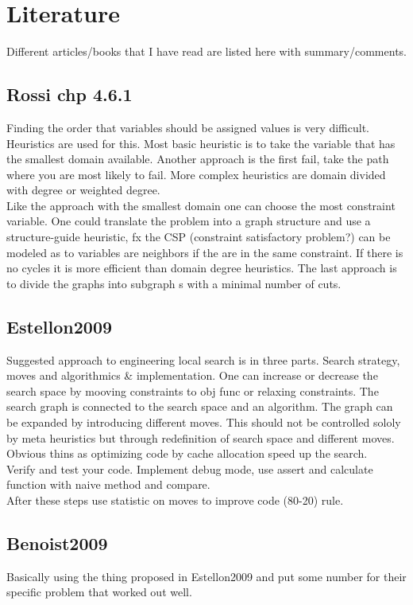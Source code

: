 \documentclass[a4paper,10pt]{article}
\title{}
\author{}
\begin{document}
\section{Literature}
Different articles/books that I have read are listed here with summary/comments. 
\subsection{Rossi chp 4.6.1}
Finding the order that variables should be assigned values is very difficult. Heuristics are used for this. Most basic 
heuristic is to take the variable that has the smallest domain available. Another approach is the first fail, take the 
path where you are most likely to fail. More complex heuristics are domain divided with degree or weighted degree. \\
Like the approach with the smallest domain one can choose the most constraint variable. One could translate the 
problem into a graph structure and use a structure-guide heuristic, fx the CSP (constraint satisfactory problem?) can 
be modeled as to variables are neighbors if the are in the same constraint. If there is no cycles it is more efficient 
than domain degree heuristics. The last approach is to divide the graphs into subgraph s with a minimal number of cuts. 
\subsection{Estellon2009}
Suggested approach to engineering local search is in three parts. Search strategy, moves and algorithmics \& 
implementation. One can increase or decrease the search space by mooving constraints to obj func or relaxing 
constraints. The search graph is connected to the search space and an algorithm. The graph can be expanded by 
introducing different moves. This should not be controlled sololy by meta heuristics but through redefinition of search 
space and different moves. Obvious thins as optimizing code by cache allocation speed up the search. \\ 
Verify and test your code. Implement debug mode, use assert and calculate function with naive method and compare. \\
After these steps use statistic on moves to improve code (80-20) rule. 
\subsection{Benoist2009}
Basically using the thing proposed in Estellon2009 and put some number for their specific problem that worked out well. 
\end{document}
